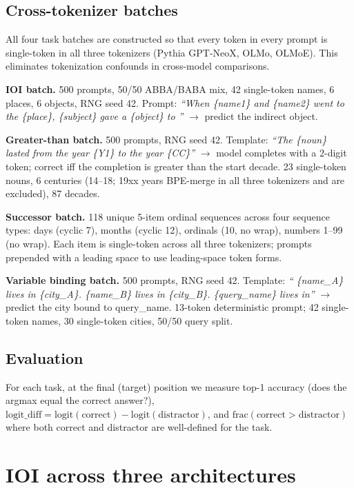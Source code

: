 \documentclass[11pt]{article}
\begin{document}
\subsection{Cross-tokenizer batches}

All four task batches are constructed so that every token in every prompt is single-token in all three tokenizers (Pythia GPT-NeoX, OLMo, OLMoE). This eliminates tokenization confounds in cross-model comparisons.

\textbf{IOI batch.} 500 prompts, 50/50 ABBA/BABA mix, 42 single-token names, 6 places, 6 objects, RNG seed 42. Prompt: \emph{``When \{name1\} and \{name2\} went to the \{place\}, \{subject\} gave a \{object\} to ''} $\to$ predict the indirect object.

\textbf{Greater-than batch.} 500 prompts, RNG seed 42. Template: \emph{``The \{noun\} lasted from the year \{Y1\} to the year \{CC\}''} $\to$ model completes with a 2-digit token; correct iff the completion is greater than the start decade. 23 single-token nouns, 6 centuries (14--18; 19xx years BPE-merge in all three tokenizers and are excluded), 87 decades.

\textbf{Successor batch.} 118 unique 5-item ordinal sequences across four sequence types: days (cyclic 7), months (cyclic 12), ordinals (10, no wrap), numbers 1--99 (no wrap). Each item is single-token across all three tokenizers; prompts prepended with a leading space to use leading-space token forms.

\textbf{Variable binding batch.} 500 prompts, RNG seed 42. Template: \emph{`` \{name\_A\} lives in \{city\_A\}. \{name\_B\} lives in \{city\_B\}. \{query\_name\} lives in''} $\to$ predict the city bound to query\_name. 13-token deterministic prompt; 42 single-token names, 30 single-token cities, 50/50 query split.

\subsection{Evaluation}

For each task, at the final (target) position we measure top-1 accuracy (does the argmax equal the correct answer?), $\mathrm{logit\_diff} = \mathrm{logit}(\text{correct}) - \mathrm{logit}(\text{distractor})$, and $\mathrm{frac}(\text{correct} > \text{distractor})$ where both correct and distractor are well-defined for the task.

\section{IOI across three architectures}
\label{sec:ioi}
\end{document}

